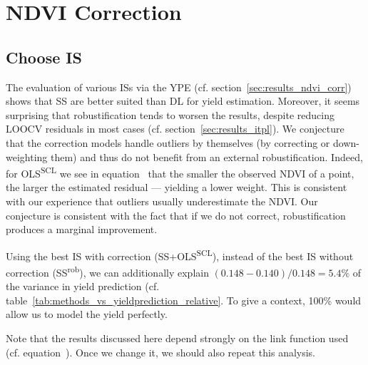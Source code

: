 \section{NDVI Correction}{\label{sec:discussion_corr}
    \subsection{Choose {{IS}}}\label{sec:discussion_iplfstrategy-choose}

    The evaluation of various ISs via the YPE (cf. section~\ref{sec:results_ndvi_corr}) shows that SS are better suited than DL for yield estimation. Moreover, it seems surprising that robustification tends to worsen the results, despite reducing LOOCV residuals in most cases (cf. section~\ref{sec:results_itpl}). We conjecture that the correction models handle outliers by themselves (by correcting or down-weighting them) and thus do not benefit from an external robustification. Indeed, for OLS\textsuperscript{SCL} we see in equation~ that the smaller the observed NDVI of a point, the larger the estimated residual --- yielding a lower weight. This is consistent with our experience that outliers usually underestimate the NDVI. Our conjecture is consistent with the fact that if we do not correct, robustification produces a marginal improvement. 
    
    Using the best IS with correction (SS+OLS\textsuperscript{SCL}), instead of the best IS without correction (SS\textsuperscript{rob}), we can additionally explain $(0.148-0.140)/0.148 = 5.4\%$ of the variance in yield prediction (cf. table~\ref{tab:methods_vs_yieldprediction_relative}. To give a context, 100\% would allow us to model the yield perfectly.
    
    Note that the results discussed here depend strongly on the link function used (cf. equation~). Once we change it, we should also repeat this analysis.
            


}
